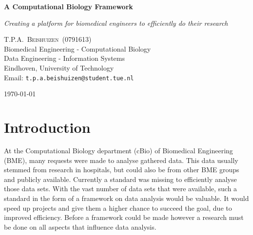 \documentclass[10pt,a4paper]{article}
\newcommand{\documenttitle}{A Computational Biology Framework}
\newcommand{\documentsubtitle}{Creating a platform for biomedical engineers to efficiently do their research}
\begin{document}
	
	\begin{titlepage}
		
		\center
		
		\vspace*{3cm}
		
		\textbf{\huge \documenttitle}
		
		\textit{\LARGE \documentsubtitle}
		
		\vspace*{2cm}
		
		\large
		\centering
		T.P.A.~\textsc{Beishuizen}~(0791613)\\
		Biomedical Engineering - Computational Biology\\
		Data Engineering - Information Systems\\
		Eindhoven, University of Technology\\
		Email: \texttt{t.p.a.beishuizen@student.tue.nl}
		
		\vfill
		
		\vspace*{1cm}
		
		\today
		
	\end{titlepage}
	
	\tableofcontents
	
	
	\pagestyle{fancy}
	\fancyhead{} %
	\fancyfoot{} %
	\renewcommand{\headrulewidth}{0.4pt}
	\renewcommand{\footrulewidth}{0.4pt}
	
	\fancyhead[L]{\rightmark}
	\fancyfoot[C]{\thepage}
	
	
	\clearpage
	
	\section{Introduction}
	\label{sec:Introduction}
	
	At the Computational Biology department (cBio) of Biomedical Engineering (BME), many requests were made to analyse gathered data. This data usually stemmed from research in hospitals, but could also be from other BME groups and publicly available. Currently a standard was missing to efficiently analyse those data sets. With the vast number of data sets that were available, such a standard in the form of a framework on data analysis would be valuable. It would speed up projects and give them a higher chance to succeed the goal, due to improved efficiency. Before a framework could be made however a research must be done on all aspects that influence data analysis.
	
\end{document}
